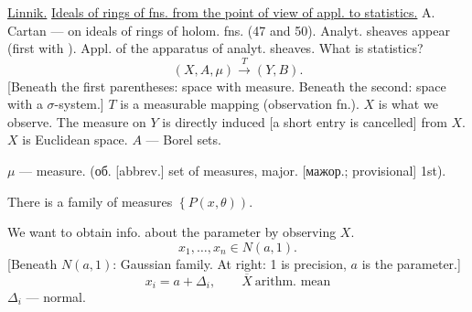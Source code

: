 \underline{Linnik.}
\underline{Ideals of rings of fns. from the point of view of appl. to statistics.}
A. Cartan --- on ideals of rings of holom. fns. (47 and 50).
Analyt. sheaves appear (first with ).
Appl. of the apparatus of analyt. sheaves.
What is statistics?
\begin{equation*}
(X,A,\mu)\overset{T}{\longrightarrow}(Y,B).
\end{equation*}
[Beneath the first parentheses: space with measure. Beneath the second: space with a $\sigma$-system.]
$T$ is a measurable mapping (observation fn.).
$X$ is what we observe.
The measure on $Y$ is directly induced [a short entry is cancelled] from $X$.
$X$ is Euclidean space.
$A$ --- Borel sets.
\par\noindent\begin{minipage}{\linewidth}
$\mu$ --- measure.
(\textcolor{orange!65!black}{об. [abbrev.] set of measures, major. [мажор.; provisional] 1st}).
\end{minipage}\par
\par\noindent\begin{minipage}{\linewidth}
There is a family of measures $\left\{P(x,\theta)\right)$.
\end{minipage}\par
[Beneath $P(x,\theta)$: given by a density.]
We want to obtain info. about the parameter by observing $X$.
\begin{equation*}
x_1,\ldots,x_n\in N(a,1).
\end{equation*}
[Beneath $N(a,1)$: Gaussian family. At right: 1 is precision, $a$ is the parameter.]
\begin{equation*}
x_i=a+\Delta_i,\qquad\overline X\ \text{arithm. mean}
\end{equation*}
$\Delta_i$ --- normal.

